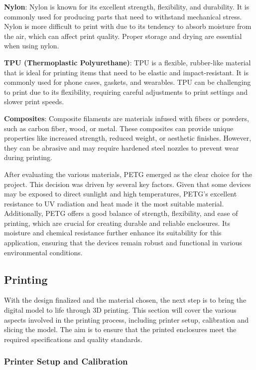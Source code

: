 \textbf{Nylon}: Nylon is known for its excellent strength, flexibility, and durability. It is 
commonly used for producing parts that need to withstand mechanical stress. Nylon is more 
difficult to print with due to its tendency to absorb moisture from the air, which can affect 
print quality. Proper storage and drying are essential when using nylon.

\textbf{TPU (Thermoplastic Polyurethane)}: TPU is a flexible, rubber-like material that is ideal 
for printing items that need to be elastic and impact-resistant. It is commonly used for phone 
cases, gaskets, and wearables. TPU can be challenging to print due to its flexibility, requiring 
careful adjustments to print settings and slower print speeds.

\textbf{Composites}: Composite filaments are materials infused with fibers or powders, such as 
carbon fiber, wood, or metal. These composites can provide unique properties like increased 
strength, reduced weight, or aesthetic finishes. However, they can be abrasive and may require 
hardened steel nozzles to prevent wear during printing.

After evaluating the various materials, PETG emerged as the clear choice for the project. This 
decision was driven by several key factors. Given that some devices may be exposed to direct 
sunlight and high temperatures, PETG's excellent resistance to UV radiation and heat made it the 
most suitable material. Additionally, PETG offers a good balance of strength, flexibility, and 
ease of printing, which are crucial for creating durable and reliable enclosures. Its moisture and 
chemical resistance further enhance its suitability for this application, ensuring that the 
devices remain robust and functional in various environmental conditions.

\subsection{Printing}

With the design finalized and the material chosen, the next step is to bring the digital model to 
life through 3D printing. This section will cover the various aspects involved in the printing 
process, including printer setup, calibration and slicing the model. The aim is to ensure that the 
printed enclosures meet the required specifications and quality standards.

\subsubsection{Printer Setup and Calibration}

